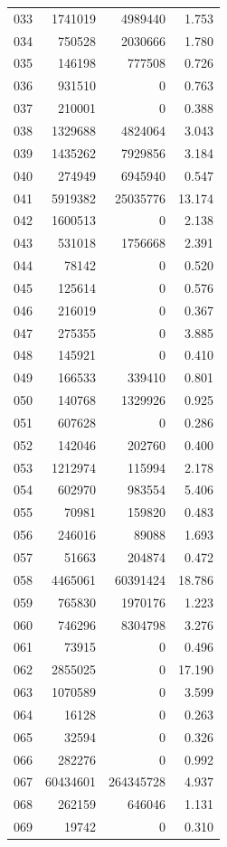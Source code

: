 \documentclass[anonymous,notoc]{gmcm2026}
\begin{document}
\begin{longtable}{lrrr}
033 & 1741019 & 4989440 & 1.753 \\
034 & 750528 & 2030666 & 1.780 \\
035 & 146198 & 777508 & 0.726 \\
036 & 931510 & 0 & 0.763 \\
037 & 210001 & 0 & 0.388 \\
038 & 1329688 & 4824064 & 3.043 \\
039 & 1435262 & 7929856 & 3.184 \\
040 & 274949 & 6945940 & 0.547 \\
041 & 5919382 & 25035776 & 13.174 \\
042 & 1600513 & 0 & 2.138 \\
043 & 531018 & 1756668 & 2.391 \\
044 & 78142 & 0 & 0.520 \\
045 & 125614 & 0 & 0.576 \\
046 & 216019 & 0 & 0.367 \\
047 & 275355 & 0 & 3.885 \\
048 & 145921 & 0 & 0.410 \\
049 & 166533 & 339410 & 0.801 \\
050 & 140768 & 1329926 & 0.925 \\
051 & 607628 & 0 & 0.286 \\
052 & 142046 & 202760 & 0.400 \\
053 & 1212974 & 115994 & 2.178 \\
054 & 602970 & 983554 & 5.406 \\
055 & 70981 & 159820 & 0.483 \\
056 & 246016 & 89088 & 1.693 \\
057 & 51663 & 204874 & 0.472 \\
058 & 4465061 & 60391424 & 18.786 \\
059 & 765830 & 1970176 & 1.223 \\
060 & 746296 & 8304798 & 3.276 \\
061 & 73915 & 0 & 0.496 \\
062 & 2855025 & 0 & 17.190 \\
063 & 1070589 & 0 & 3.599 \\
064 & 16128 & 0 & 0.263 \\
065 & 32594 & 0 & 0.326 \\
066 & 282276 & 0 & 0.992 \\
067 & 60434601 & 264345728 & 4.937 \\
068 & 262159 & 646046 & 1.131 \\
069 & 19742 & 0 & 0.310 \\

\end{longtable}
\end{document}
